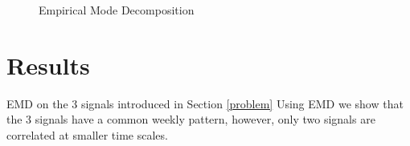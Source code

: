 \documentclass[letter,10pt]{sig-alternate-10pt}
\begin{document}
\begin{figure}
 \caption{Empirical Mode Decomposition}
 \label{fig:raw}
\end{figure}

\newpage

\section{Results}
EMD on the 3 signals introduced in Section \ref{problem}
Using EMD we show that the 3 signals have a common weekly pattern, however, only two signals are correlated at smaller time scales.
\end{document}
